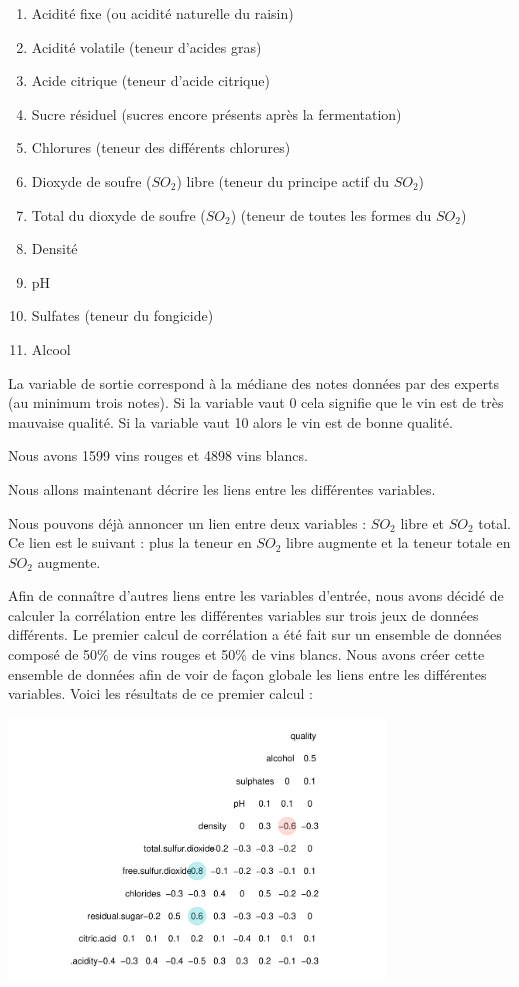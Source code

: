 \documentclass[
]{article}
\providecommand{\tightlist}{%
  \setlength{\itemsep}{0pt}\setlength{\parskip}{0pt}}
\begin{document}
\begin{enumerate}
\def\labelenumi{\arabic{enumi}.}
\tightlist
\item
  Acidité fixe (ou acidité naturelle du raisin)
\item
  Acidité volatile (teneur d'acides gras)
\item
  Acide citrique (teneur d'acide citrique)
\item
  Sucre résiduel (sucres encore présents après la fermentation)
\item
  Chlorures (teneur des différents chlorures)
\item
  Dioxyde de soufre (\(SO_2\)) libre (teneur du principe actif du
  \(SO_2\))
\item
  Total du dioxyde de soufre (\(SO_2\)) (teneur de toutes les formes du
  \(SO_2\))
\item
  Densité
\item
  pH
\item
  Sulfates (teneur du fongicide)
\item
  Alcool
\end{enumerate}

La variable de sortie correspond à la médiane des notes données par des
experts (au minimum trois notes). Si la variable vaut 0 cela signifie
que le vin est de très mauvaise qualité. Si la variable vaut 10 alors le
vin est de bonne qualité.

Nous avons 1599 vins rouges et 4898 vins blancs.

Nous allons maintenant décrire les liens entre les différentes
variables.

Nous pouvons déjà annoncer un lien entre deux variables : \(SO_2\) libre
et \(SO_2\) total. Ce lien est le suivant : plus la teneur en \(SO_2\)
libre augmente et la teneur totale en \(SO_2\) augmente.

Afin de connaître d'autres liens entre les variables d'entrée, nous
avons décidé de calculer la corrélation entre les différentes variables
sur trois jeux de données différents. Le premier calcul de corrélation a
été fait sur un ensemble de données composé de 50\% de vins rouges et
50\% de vins blancs. Nous avons créer cette ensemble de données afin de
voir de façon globale les liens entre les différentes variables. Voici
les résultats de ce premier calcul :

\begin{center}
	\includegraphics[width=10cm]{repport_files/figure-latex/unnamed-chunk-1-1.pdf}
\end{center}
\end{document}
